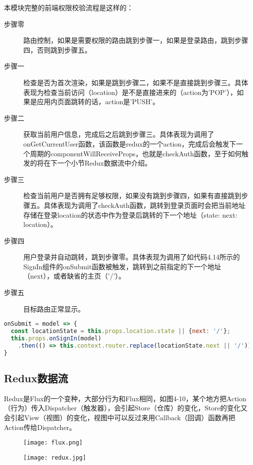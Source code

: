 本模块完整的前端权限校验流程是这样的：
\begin{description}
  \item[步骤零] 路由控制，如果是需要权限的路由跳到步骤一，如果是登录路由，跳到步骤四，否则跳到步骤五。
  \item[步骤一] 检查是否为首次渲染，如果是跳到步骤二，如果不是直接跳到步骤三。具体表现为检查当前访问（location）是不是直接进来的（action为'POP'），如果是应用内页面跳转的话，action是'PUSH'。
  \item[步骤二] 获取当前用户信息，完成后之后跳到步骤三。具体表现为调用了onGetCurrentUser函数，该函数是redux的一个action，完成后会触发下一个周期的componentWillReceiveProps，也就是checkAuth函数，至于如何触发的将在下一个小节Redux数据流中介绍。
  \item[步骤三] 检查当前用户是否拥有足够权限，如果没有跳到步骤四，如果有直接跳到步骤五。具体表现为调用了checkAuth函数，跳转到登录页面时会把当前地址存储在登录location的状态中作为登录后跳转的下一个地址（state: {next: location}）。
  \item[步骤四] 用户登录并自动跳转，跳到步骤零。具体表现为调用了如代码4.14所示的SignIn组件的onSubmit函数被触发，跳转到之前指定的下一个地址（next），或者缺省的主页（'/'）。
  \item[步骤五] 目标路由正常显示。
\end{description}
\begin{lstlisting}[language={JavaScript}, caption={SignIn组件中的onSubmit函数}]
onSubmit = model => {
  const locationState = this.props.location.state || {next: '/'};
  this.props.onSignIn(model)
    .then(() => this.context.router.replace(locationState.next || '/'))
}
\end{lstlisting}
\subsection{Redux数据流}
Redux是Flux的一个变种，大部分行为和Flux相同，如图4-10，某个地方把Action（行为）传入Dispatcher（触发器），会引起Store（仓库）的变化，Store的变化又会引起View（视图）的变化，视图中可以反过来用Callback（回调）函数再把Action传给Dispatcher。
\begin{figure}[!htp]
 \centering
 \texttt{[image: flux.png]}
\end{figure}

\begin{figure}[!htp]
 \centering
 \texttt{[image: redux.jpg]}
\end{figure}

